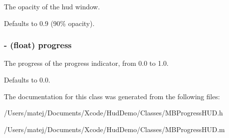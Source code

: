 The opacity of the hud window. 

Defaults to 0.9 (90\% opacity). \hypertarget{interface_m_b_progress_h_u_d_4c8328617d11efd1f5452032246ca97f}{
\subsubsection[{progress}]{\setlength{\rightskip}{0pt plus 5cm}- (float) progress}}
\label{interface_m_b_progress_h_u_d_4c8328617d11efd1f5452032246ca97f}


The progress of the progress indicator, from 0.0 to 1.0. 

Defaults to 0.0. 

The documentation for this class was generated from the following files:\begin{CompactItemize}
\item 
/Users/matej/Documents/Xcode/HudDemo/Classes/MBProgressHUD.h\item 
/Users/matej/Documents/Xcode/HudDemo/Classes/MBProgressHUD.m\end{CompactItemize}
